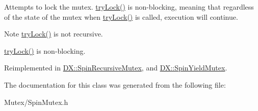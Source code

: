 Attempts to lock the mutex. \hyperlink{class_d_x_1_1_spin_mutex_af1a59657616a8c68ff5785e18e53a469}{try\-Lock()} is non-\/blocking, meaning that regardless of the state of the mutex when \hyperlink{class_d_x_1_1_spin_mutex_af1a59657616a8c68ff5785e18e53a469}{try\-Lock()} is called, execution will continue. 

\begin{DoxyNote}{Note}
\hyperlink{class_d_x_1_1_spin_mutex_af1a59657616a8c68ff5785e18e53a469}{try\-Lock()} is not recursive. 

\hyperlink{class_d_x_1_1_spin_mutex_af1a59657616a8c68ff5785e18e53a469}{try\-Lock()} is non-\/blocking. 
\end{DoxyNote}


Reimplemented in \hyperlink{class_d_x_1_1_spin_recursive_mutex_a9150334e2741a1de69f177491214cf15}{D\-X\-::\-Spin\-Recursive\-Mutex}, and \hyperlink{class_d_x_1_1_spin_yield_mutex_acd1ed560cf8afd7363a520beff4b5455}{D\-X\-::\-Spin\-Yield\-Mutex}.



The documentation for this class was generated from the following file\-:\begin{DoxyCompactItemize}
\item 
Mutex/Spin\-Mutex.\-h\end{DoxyCompactItemize}
